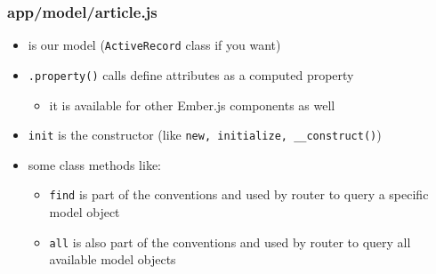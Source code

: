 \documentclass[compress]{beamer}
\begin{document}
\begin{frame}

\frametitle{app/model/article.js}

\begin{itemize}[<+->]
  \item is our model (\texttt{ActiveRecord} class if you want)
  \item \texttt{.property()} calls define attributes as a computed property
  \begin{itemize}[<+->]
    \item it is available for other Ember.js components as well
  \end{itemize}
  \item \texttt{init} is the constructor (like \texttt{new, initialize, \_\_construct()})
  \item some class methods like:
  \begin{itemize}[<+->]
    \item \texttt{find} is part of the conventions and used by router to query a specific model object
    \item \texttt{all} is also part of the conventions and used by router to query all available model objects
  \end{itemize}
\end{itemize}

\begin{columns}
\begin{column}{0.5\textwidth}
\inputminted[fontsize=\tiny,gobble=2,linenos=true,firstline=6,lastline=20]{javascript}{code/js/app/model/article.js}
\end{column}
\begin{column}{0.5\textwidth}
\inputminted[fontsize=\tiny,gobble=2,linenos=true,firstline=30,lastline=41,firstnumber=24]{javascript}{code/js/app/model/article.js}
\end{column}
\end{columns}

\end{frame}
\end{document}
